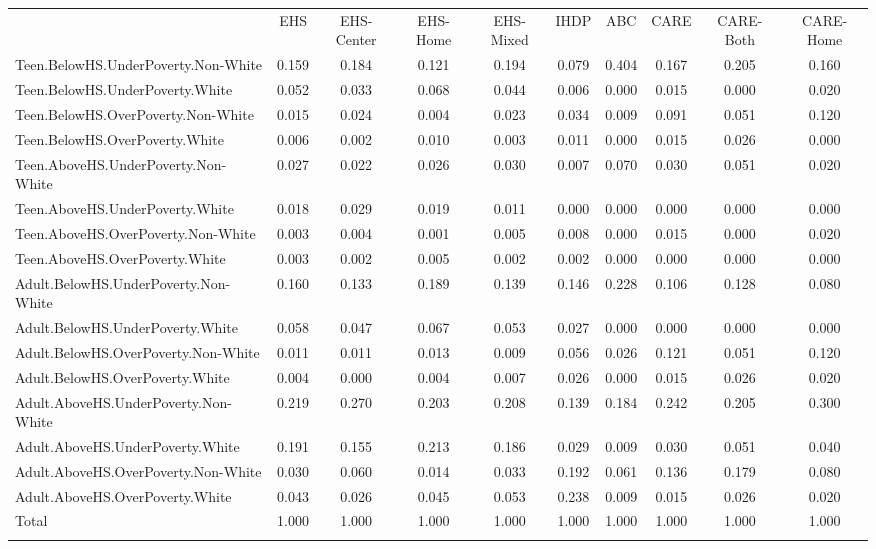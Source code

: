 \begin{tabular}{lccccccccc}
\hline \noalign{\smallskip} & EHS & EHS-Center & EHS-Home & EHS-Mixed & IHDP & ABC & CARE & CARE-Both & CARE-Home\\
\noalign{\smallskip}\hline \noalign{\smallskip}Teen.BelowHS.UnderPoverty.Non-White & 0.159 & 0.184 & 0.121 & 0.194 & 0.079 & 0.404 & 0.167 & 0.205 & 0.160\\
Teen.BelowHS.UnderPoverty.White & 0.052 & 0.033 & 0.068 & 0.044 & 0.006 & 0.000 & 0.015 & 0.000 & 0.020\\
Teen.BelowHS.OverPoverty.Non-White & 0.015 & 0.024 & 0.004 & 0.023 & 0.034 & 0.009 & 0.091 & 0.051 & 0.120\\
Teen.BelowHS.OverPoverty.White & 0.006 & 0.002 & 0.010 & 0.003 & 0.011 & 0.000 & 0.015 & 0.026 & 0.000\\
Teen.AboveHS.UnderPoverty.Non-White & 0.027 & 0.022 & 0.026 & 0.030 & 0.007 & 0.070 & 0.030 & 0.051 & 0.020\\
Teen.AboveHS.UnderPoverty.White & 0.018 & 0.029 & 0.019 & 0.011 & 0.000 & 0.000 & 0.000 & 0.000 & 0.000\\
Teen.AboveHS.OverPoverty.Non-White & 0.003 & 0.004 & 0.001 & 0.005 & 0.008 & 0.000 & 0.015 & 0.000 & 0.020\\
Teen.AboveHS.OverPoverty.White & 0.003 & 0.002 & 0.005 & 0.002 & 0.002 & 0.000 & 0.000 & 0.000 & 0.000\\
Adult.BelowHS.UnderPoverty.Non-White & 0.160 & 0.133 & 0.189 & 0.139 & 0.146 & 0.228 & 0.106 & 0.128 & 0.080\\
Adult.BelowHS.UnderPoverty.White & 0.058 & 0.047 & 0.067 & 0.053 & 0.027 & 0.000 & 0.000 & 0.000 & 0.000\\
Adult.BelowHS.OverPoverty.Non-White & 0.011 & 0.011 & 0.013 & 0.009 & 0.056 & 0.026 & 0.121 & 0.051 & 0.120\\
Adult.BelowHS.OverPoverty.White & 0.004 & 0.000 & 0.004 & 0.007 & 0.026 & 0.000 & 0.015 & 0.026 & 0.020\\
Adult.AboveHS.UnderPoverty.Non-White & 0.219 & 0.270 & 0.203 & 0.208 & 0.139 & 0.184 & 0.242 & 0.205 & 0.300\\
Adult.AboveHS.UnderPoverty.White & 0.191 & 0.155 & 0.213 & 0.186 & 0.029 & 0.009 & 0.030 & 0.051 & 0.040\\
Adult.AboveHS.OverPoverty.Non-White & 0.030 & 0.060 & 0.014 & 0.033 & 0.192 & 0.061 & 0.136 & 0.179 & 0.080\\
Adult.AboveHS.OverPoverty.White & 0.043 & 0.026 & 0.045 & 0.053 & 0.238 & 0.009 & 0.015 & 0.026 & 0.020\\
Total & 1.000 & 1.000 & 1.000 & 1.000 & 1.000 & 1.000 & 1.000 & 1.000 & 1.000\\
\noalign{\smallskip}\hline\end{tabular}\\
